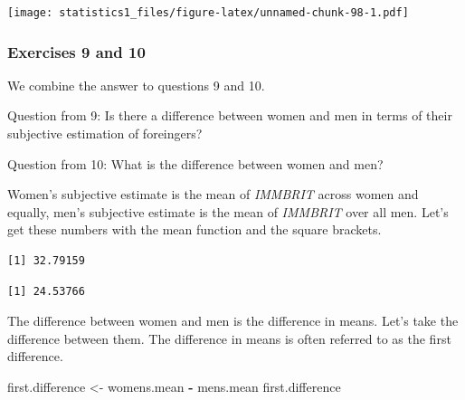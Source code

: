 \documentclass[]{article}
\newenvironment{Shaded}{\begin{snugshade}}{\end{snugshade}}
\newcommand{\KeywordTok}[1]{\textcolor[rgb]{0.13,0.29,0.53}{\textbf{#1}}}
\newcommand{\DecValTok}[1]{\textcolor[rgb]{0.00,0.00,0.81}{#1}}
\newcommand{\StringTok}[1]{\textcolor[rgb]{0.31,0.60,0.02}{#1}}
\newcommand{\OperatorTok}[1]{\textcolor[rgb]{0.81,0.36,0.00}{\textbf{#1}}}
\newcommand{\NormalTok}[1]{#1}
\theoremstyle{definition}
\theoremstyle{definition}
\theoremstyle{definition}
\theoremstyle{remark}
\begin{document}
\texttt{[image: statistics1\_files/figure-latex/unnamed-chunk-98-1.pdf]}

\subsubsection{Exercises 9 and 10}\label{exercises-9-and-10}

We combine the answer to questions 9 and 10.

Question from 9: Is there a difference between women and men in terms of
their subjective estimation of foreingers?

Question from 10: What is the difference between women and men?

Women's subjective estimate is the mean of \emph{IMMBRIT} across women
and equally, men's subjective estimate is the mean of \emph{IMMBRIT}
over all men. Let's get these numbers with the mean function and the
square brackets.

\begin{Shaded}
\end{Shaded}

\begin{verbatim}
[1] 32.79159
\end{verbatim}

\begin{Shaded}
\end{Shaded}

\begin{verbatim}
[1] 24.53766
\end{verbatim}

The difference between women and men is the difference in means. Let's
take the difference between them. The difference in means is often
referred to as the first difference.

\begin{Shaded}
\begin{Highlighting}[]
\NormalTok{first.difference <-}\StringTok{ }\NormalTok{womens.mean }\OperatorTok{-}\StringTok{ }\NormalTok{mens.mean}
\NormalTok{first.difference}
\end{Highlighting}
\end{Shaded}
\end{document}
